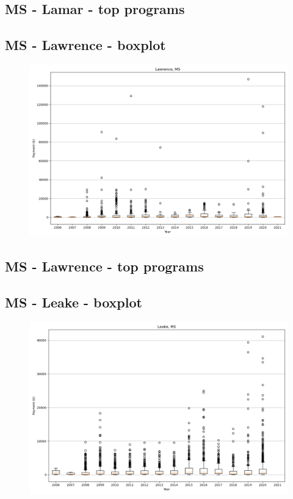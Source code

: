 \subsection*{MS - Lamar - top programs}

\newpage
\subsection*{MS - Lawrence - boxplot}
\begin{figure}[h]
\centering
\includegraphics[width=7in]{../output/boxplots/counties/Lawrence-MS_boxplot.png}
\end{figure}


\subsection*{MS - Lawrence - top programs}

\newpage
\subsection*{MS - Leake - boxplot}
\begin{figure}[h]
\centering
\includegraphics[width=7in]{../output/boxplots/counties/Leake-MS_boxplot.png}
\end{figure}


